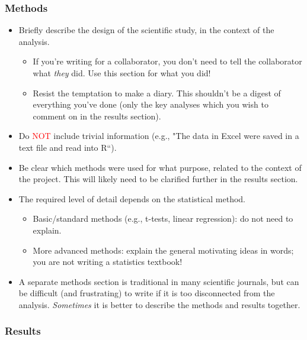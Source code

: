 \documentclass[
  openany]{book}
\providecommand{\tightlist}{%
  \setlength{\itemsep}{0pt}\setlength{\parskip}{0pt}}
\begin{document}
\hypertarget{methodsreport}{%
\subsubsection{Methods}\label{methodsreport}}

\begin{itemize}
\tightlist
\item
  Briefly describe the design of the scientific study, in the context of the analysis.

  \begin{itemize}
  \tightlist
  \item
    If you're writing for a collaborator, you don't need to tell the collaborator what \emph{they} did. Use this section for what you did!
  \item
    Resist the temptation to make a diary. This shouldn't be a digest of everything you've done (only the key analyses which you wish to comment on in the results section).
  \end{itemize}
\item
  Do \textcolor{red}{NOT} include trivial information (e.g., "The data in Excel were saved in a text file and read into R``).
\item
  Be clear which methods were used for what purpose, related to the context of the project. This will likely need to be clarified further in the results section.
\item
  The required level of detail depends on the statistical method.

  \begin{itemize}
  \tightlist
  \item
    Basic/standard methods (e.g., t-tests, linear regression): do not need to explain.
  \item
    More advanced methods: explain the general motivating ideas in words; you are not writing a statistics textbook!
  \end{itemize}
\item
  A separate methods section is traditional in many scientific journals, but can be difficult (and frustrating) to write if it is too disconnected from the analysis. \emph{Sometimes} it is better to describe the methods and results together.
\end{itemize}

\hypertarget{resultsreport}{%
\subsubsection{Results}\label{resultsreport}}
\end{document}
